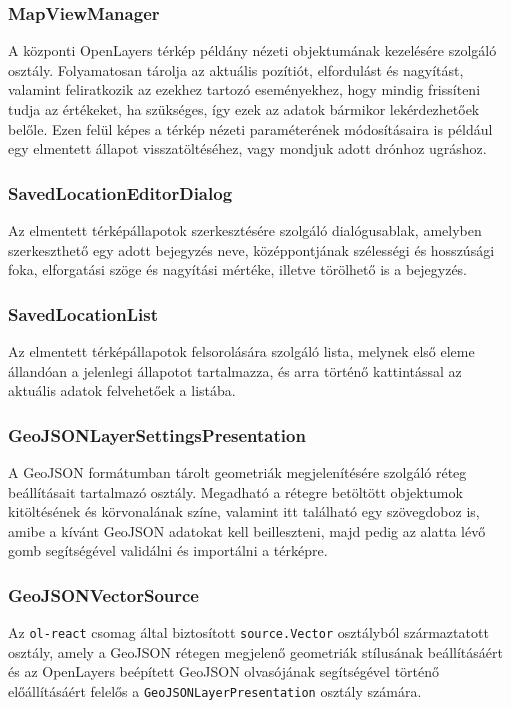 \subsubsection{MapViewManager}
A központi OpenLayers térkép példány nézeti objektumának kezelésére szolgáló
osztály. Folyamatosan tárolja az aktuális pozítiót, elfordulást és nagyítást,
valamint feliratkozik az ezekhez tartozó eseményekhez, hogy mindig frissíteni
tudja az értékeket, ha szükséges, így ezek az adatok bármikor lekérdezhetőek
belőle. Ezen felül képes a térkép nézeti paraméterének módosításaira is például
egy elmentett állapot visszatöltéséhez, vagy mondjuk adott drónhoz ugráshoz.

\subsubsection{SavedLocationEditorDialog}
Az elmentett térképállapotok szerkesztésére szolgáló dialógusablak, amelyben
szerkeszthető egy adott bejegyzés neve, középpontjának szélességi és hosszúsági
foka, elforgatási szöge és nagyítási mértéke, illetve törölhető is a bejegyzés.

\subsubsection{SavedLocationList}
Az elmentett térképállapotok felsorolására szolgáló lista, melynek első eleme
állandóan a jelenlegi állapotot tartalmazza, és arra történő kattintással az
aktuális adatok felvehetőek a listába.

\subsubsection{GeoJSONLayerSettingsPresentation}
A GeoJSON formátumban tárolt geometriák megjelenítésére szolgáló réteg
beállításait tartalmazó osztály. Megadható a rétegre betöltött objektumok
kitöltésének és körvonalának színe, valamint itt található egy szövegdoboz is,
amibe a kívánt GeoJSON adatokat kell beilleszteni, majd pedig az alatta lévő
gomb segítségével validálni és importálni a térképre.

\subsubsection{GeoJSONVectorSource}
Az \verb|ol-react| csomag által biztosított \verb|source.Vector| osztályból
származtatott osztály, amely a GeoJSON rétegen megjelenő geometriák stílusának
beállításáért és az OpenLayers beépített GeoJSON olvasójának segítségével
történő előállításáért felelős a \verb|GeoJSONLayerPresentation| osztály
számára.

